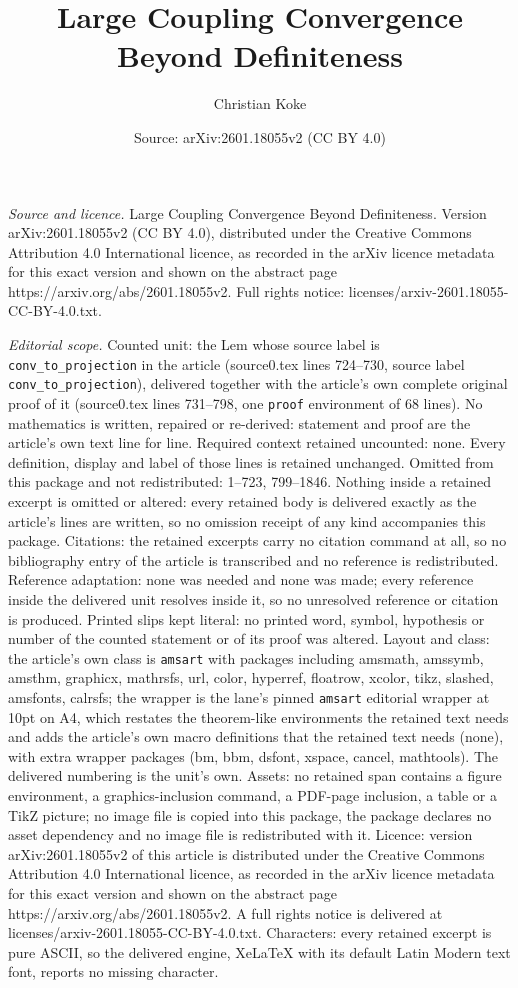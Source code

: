 \documentclass[10pt,a4paper]{amsart}
\title[Large Coupling Convergence Beyond Definiteness]{Large Coupling Convergence Beyond Definiteness}
\author{Christian Koke}
\date{Source: arXiv:2601.18055v2 (CC BY 4.0)}
\begin{document}
\maketitle

\noindent\emph{Source and licence.} Large Coupling Convergence Beyond Definiteness. Version arXiv:2601.18055v2 (CC BY 4.0), distributed under the Creative Commons Attribution 4.0 International licence, as recorded in the arXiv licence metadata for this exact version and shown on the abstract page https://arxiv.org/abs/2601.18055v2. Full rights notice: licenses/arxiv-2601.18055-CC-BY-4.0.txt.\par\smallskip

\noindent\textit{Editorial scope.} Counted unit: the Lem whose source label is \texttt{conv\_to\_projection} in the article (source0.tex lines 724--730, source label \texttt{conv\_to\_projection}), delivered together with the article's own complete original proof of it (source0.tex lines 731--798, one \texttt{proof} environment of 68 lines). No mathematics is written, repaired or re-derived: statement and proof are the article's own text line for line. Required context retained uncounted: none. Every definition, display and label of those lines is retained unchanged. Omitted from this package and not redistributed: 1--723, 799--1846. Nothing inside a retained excerpt is omitted or altered: every retained body is delivered exactly as the article's lines are written, so no omission receipt of any kind accompanies this package. Citations: the retained excerpts carry no citation command at all, so no bibliography entry of the article is transcribed and no reference is redistributed. Reference adaptation: none was needed and none was made; every reference inside the delivered unit resolves inside it, so no unresolved reference or citation is produced. Printed slips kept literal: no printed word, symbol, hypothesis or number of the counted statement or of its proof was altered. Layout and class: the article's own class is \texttt{amsart} with packages including amsmath, amssymb, amsthm, graphicx, mathrsfs, url, color, hyperref, floatrow, xcolor, tikz, slashed, amsfonts, calrsfs; the wrapper is the lane's pinned \texttt{amsart} editorial wrapper at 10pt on A4, which restates the theorem-like environments the retained text needs and adds the article's own macro definitions that the retained text needs (none), with extra wrapper packages (bm, bbm, dsfont, xspace, cancel, mathtools). The delivered numbering is the unit's own. Assets: no retained span contains a figure environment, a graphics-inclusion command, a PDF-page inclusion, a table or a TikZ picture; no image file is copied into this package, the package declares no asset dependency and no image file is redistributed with it. Licence: version arXiv:2601.18055v2 of this article is distributed under the Creative Commons Attribution 4.0 International licence, as recorded in the arXiv licence metadata for this exact version and shown on the abstract page https://arxiv.org/abs/2601.18055v2. A full rights notice is delivered at licenses/arxiv-2601.18055-CC-BY-4.0.txt. Characters: every retained excerpt is pure ASCII, so the delivered engine, XeLaTeX with its default Latin Modern text font, reports no missing character.
\end{document}
